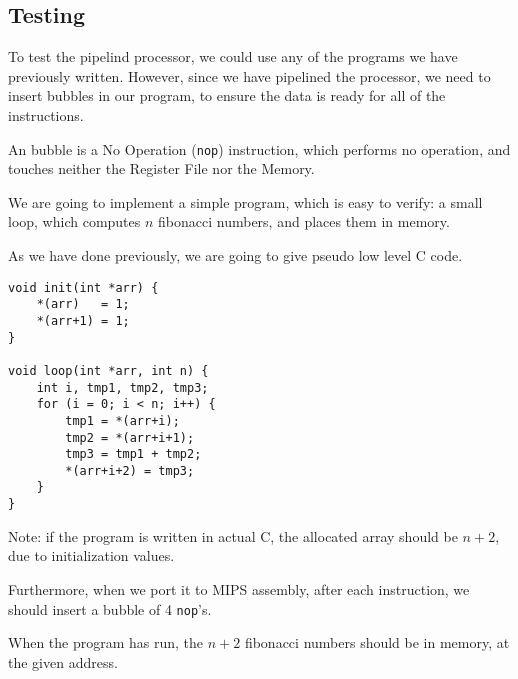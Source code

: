 \documentclass{beamer}
\begin{document}
\subsection{Testing}
\begin{frame}
    To test the pipelind processor, we could use any of the programs we have
    previously written. However, since we have pipelined the processor, we
    need to insert bubbles in our program, to ensure the data is ready for all
    of the instructions.

    \vspace{\baselineskip}
    An bubble is a No Operation (\texttt{nop}) instruction, which performs no
    operation, and touches neither the Register File nor the Memory.
\end{frame}
\begin{frame}
    We are going to implement a simple program, which is easy to verify: a
    small loop, which computes $n$ fibonacci numbers, and places them in
    memory.

    \vspace{\baselineskip}
    As we have done previously, we are going to give pseudo low level C code.
\end{frame}
\begin{frame}[fragile]
\begin{lstlisting}
void init(int *arr) {
    *(arr)   = 1;
    *(arr+1) = 1;
}

void loop(int *arr, int n) {
    int i, tmp1, tmp2, tmp3;
    for (i = 0; i < n; i++) {
        tmp1 = *(arr+i);
        tmp2 = *(arr+i+1);
        tmp3 = tmp1 + tmp2;
        *(arr+i+2) = tmp3;
    }
}
\end{lstlisting}
\end{frame}
\begin{frame}
    Note: if the program is written in actual C, the allocated array should be
    $n+2$, due to initialization values.

    \vspace{\baselineskip}
    Furthermore, when we port it to MIPS assembly, after each instruction, we
    should insert a bubble of 4 \texttt{nop}'s.

    \vspace{\baselineskip}
    When the program has run, the $n+2$ fibonacci numbers should be in memory,
    at the given address.
\end{frame}
\end{document}
